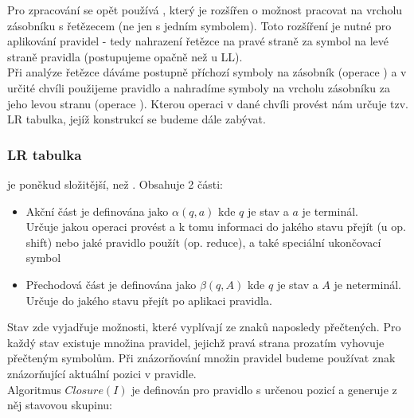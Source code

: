 Pro zpracování se opět používá , který je
rozšířen o možnost pracovat na vrcholu zásobníku s řetězecem (ne jen s jedním symbolem).
Toto rozšíření je nutné pro aplikování pravidel - tedy nahrazení řetězce na pravé straně za
symbol na levé straně pravidla (postupujeme opačně než u LL).\\

Při analýze řetězce dáváme postupně příchozí symboly na zásobník (operace )
a v určité chvíli použijeme pravidlo a nahradíme symboly na vrcholu zásobníku za
jeho levou stranu (operace ). Kterou operaci v dané chvíli provést
nám určuje tzv. LR tabulka, jejíž konstrukcí se budeme dále zabývat.\\

\subsubsection*{LR tabulka}

 je poněkud složitější, než . Obsahuje 2 části:

\begin{itemize}
  \item Akční část je definována jako $\alpha(q, a)$ kde $q$ je stav a $a$ je terminál.\\
  Určuje jakou operaci provést a k tomu informaci
  do jakého stavu přejít (u op. shift) nebo jaké pravidlo použít (op. reduce), a také speciální
  ukončovací symbol
  \item Přechodová část je definována jako $\beta(q, A)$ kde $q$ je stav a $A$ je neterminál.\\
  Určuje do jakého stavu přejít po aplikaci pravidla.
\end{itemize}

Stav zde vyjadřuje možnosti, které vyplívají ze znaků naposledy přečtených.
Pro každý stav existuje množina pravidel, jejichž pravá strana prozatím vyhovuje přečteným symbolům.
Při znázorňování množin pravidel budeme používat znak  znázorňující aktuální pozici v pravidle.\\

\noindent
Algoritmus $Closure(I)$ je definován pro pravidlo s určenou pozicí a generuje z něj stavovou skupinu:\\
\begin{algorithm}[H]
  \caption{$Closure(I)$}

  \BlankLine
\end{algorithm}
\vspace{0.5cm}

